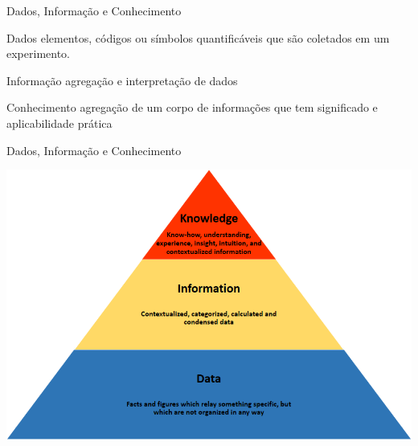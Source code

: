 \documentclass{beamer}
\begin{document}

\begin{frame}{Dados, Informação e Conhecimento}
    \begin{block}{Dados}
      elementos, códigos ou símbolos quantificáveis que são
    coletados em um experimento.
    \end{block}
    \begin{block}{Informação}
      agregação e interpretação de dados
    \end{block}
    \begin{block}{Conhecimento}
      agregação de um corpo de informações que tem significado e
      aplicabilidade prática
    \end{block}
\end{frame}


\begin{frame}{Dados, Informação e Conhecimento}
  \begin{center}
    \includegraphics[height=0.9\textheight]{Intro/Knowledge_pyramid}
  \end{center}
\end{frame}
\end{document}
